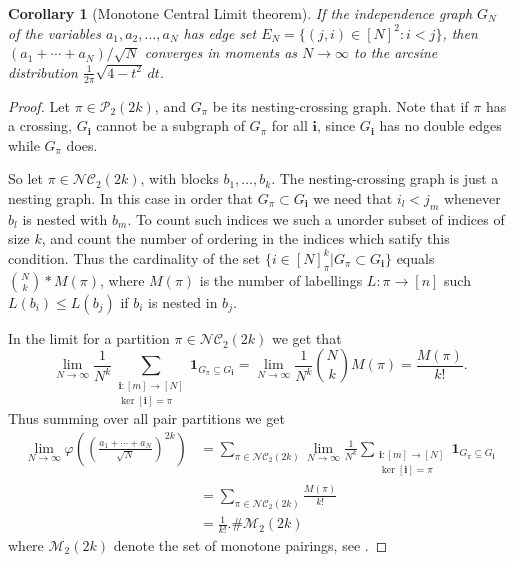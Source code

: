 \documentclass[a4paper,12pt]{extarticle}
\newtheorem{cor}[thm]{Corollary}
\theoremstyle{definition}
\theoremstyle{remark}
\begin{document}
\begin{cor}[Monotone Central Limit theorem]\label{cor_monotone_ctl}
	If the independence graph $G_N$ of the variables $a_1,a_2,\ldots,a_N$ has edge set $E_{N} = \{ (j,i) \in [N]^2 : i < j\}$, then $(a_1 + \cdots + a_N)/\sqrt{N}$ converges in moments as $N \to \infty$ to the arcsine distribution $\frac{1}{2 \pi}  \sqrt{4-t^2} \, dt$. 
\end{cor}
\begin{proof}
	
	Let $\pi\in\mathcal{P}_2(2k)$, and $G_\pi$ be its nesting-crossing graph.
	Note that if $\pi$ has a crossing, $G_{\mathbf{i}}$ cannot be a subgraph of $G_\pi$ for all $\mathbf{i}$, since $G_{\mathbf{i}}$ has no double edges while $G_\pi$ does. 
	
	
	So let $\pi\in\mathcal{NC}_2(2k)$, with blocks $b_1,\dots,b_k$. The nesting-crossing graph is just a nesting graph. In this case in order that $G_\pi\subset G_{\mathbf{i}}$  we need that $i_l<j_m$ whenever $b_l$ is nested with $b_m$. To count such indices we such a unorder subset of indices of size $k$, and count the number of ordering in the indices which satify this condition.  Thus the cardinality of the set 
	$\{i\in[N]_\pi^k|G_\pi\subset G_{\mathbf{i}}\}$ equals $\binom{N}{k}*M(\pi)$, where $M(\pi)$ is the number of labellings $L:\pi\to[n]$ such $L(b_i)\leq L(b_j)$ if $b_i$ is nested in $b_j$.
	
	In the limit for a partition $\pi\in\mathcal{NC}_2(2k)$ we get that 
	$$ \lim_{N\to \infty}\frac{1}{N^{k}}\sum\limits_{\substack{\bm{i}:[m]\to [N]\\ \ker[\bm{i}]=\pi}} \mathbf{1}_{G_\pi\subseteq G_{\mathbf{i}}}=\lim_{N\to \infty}\frac{1}{N^{k}}\binom{N}{k} M(\pi)=\frac{M(\pi)}{k!}. $$
	Thus summing over all pair partitions we get
	\begin{align*}
		\lim_{N\to \infty}\varphi\left( \left(\frac{a_1+\cdots+a_N}{\sqrt{N}} \right)^{2k} \right)&=\sum\limits_{\pi \in \mathcal{NC}_2(2k)}  \lim_{N\to \infty}\frac{1}{N^{k}}\sum\limits_{\substack{\bm{i}:[m]\to [N]\\ \ker[\bm{i}]=\pi}}  \mathbf{1}_{G_\pi\subseteq G_{\mathbf{i}}}\\&=\sum\limits_{\pi \in \mathcal{NC}_2(2k)}   \frac{M(\pi)}{k!}\\
		&= \frac{1}{k!}.\# \mathcal{M}_2(2k) 
	\end{align*}
 where $\mathcal{M}_2(2k)$ denote the set of monotone pairings, see   \cite{AHLV,LeSa06,HS}.

\end{proof}
\end{document}
